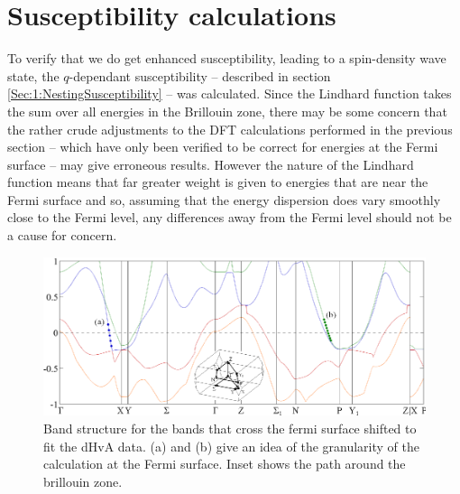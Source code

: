 
\section{Susceptibility calculations}
    \label{Sec:ResD:SubsceptibilityCalculation}

To verify that we do get enhanced susceptibility, leading to a spin-density wave state, the $q$-dependant susceptibility -- described in section \ref{Sec:1:NestingSusceptibility} -- was calculated. Since the Lindhard function takes the sum over all energies in the Brillouin zone, there may be some concern that the rather crude adjustments to the DFT calculations performed in the previous section -- which have only been verified to be correct for energies at the Fermi surface -- may give erroneous results. However the nature of the Lindhard function means that far greater weight is given to energies that are near the Fermi surface and so, assuming that the energy dispersion does vary smoothly close to the Fermi level, any differences away from the Fermi level should not be a cause for concern.  
\begin{figure}[htbp]
    \begin{center}
        \includegraphics[scale=0.95]{Chapter-dHvABaFe2P2/Figures/AngleDepMeasurements/ShiftedBandStructure/ShiftedBandStructure}
        \caption{Band structure for the bands that cross the fermi surface shifted to fit the dHvA data. (a) and (b) give an idea of the granularity of the \WIEN calculation at the Fermi surface. Inset shows the path around the brillouin zone.}
        \label{Fig:ResD:ShiftedBandStructure}
    \end{center}
\end{figure}
